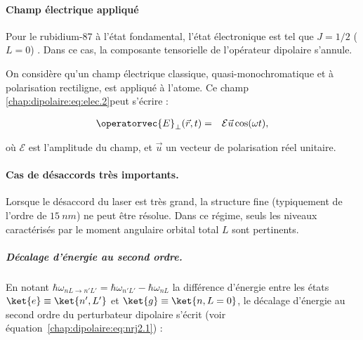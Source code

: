 




\paragraph{Champ électrique appliqué}

Pour le rubidium-87 à l’état fondamental, l’état électronique est tel que $J = 1/2$ ($L=0$) . Dans ce cas, la composante tensorielle de l'opérateur dipolaire s'annule. 

On considère qu’un champ électrique classique, quasi-monochromatique et à polarisation rectiligne, est appliqué à l’atome. Ce champ \eqref{chap:dipolaire:eq:elec.2}peut s’écrire :

\begin{eqnarray*}
	\operatorvec{E}_\perp(\vec{r}, t) & = & \mathcal{E} \vec{u} \cos(\omega t),
\end{eqnarray*}

où $\mathcal{E}$ est l’amplitude du champ, et $\vec{u}$ un vecteur de polarisation réel unitaire.


\paragraph{Cas de désaccords très importants.}

Lorsque le désaccord du laser est très grand, la structure fine (typiquement de l’ordre de $15 ~nm $) ne peut être résolue. Dans ce régime, seuls les niveaux caractérisés par le moment angulaire orbital total $L$ sont pertinents.

\subparagraph{Décalage d’énergie au second ordre.}
En notant $\hbar\omega_{ \scriptstyle nL \rightarrow n'L'} = \hbar\omega_{n'L'} - \hbar\omega_{nL}$ la différence d’énergie entre les états $\ket{e} \equiv \ket{n', L'}$ et $\ket{g} \equiv \ket{n, L=0}$, le décalage d’énergie au second ordre du perturbateur dipolaire s’écrit (voir équation~\eqref{chap:dipolaire:eq:nrj2.1}) :

